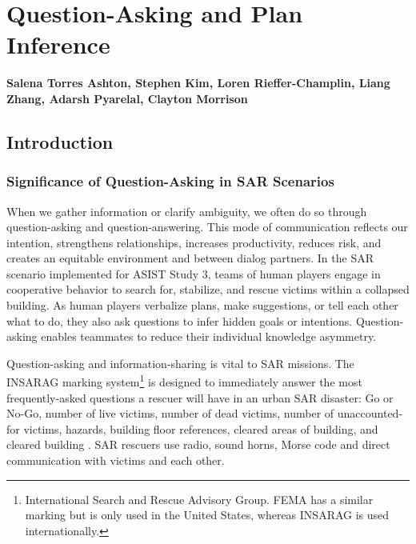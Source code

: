 \chapter{Question-Asking and Plan Inference}
\label{ch:question_plan}
\textbf{Salena Torres Ashton, Stephen Kim, Loren Rieffer-Champlin, Liang Zhang,
Adarsh Pyarelal, Clayton Morrison}

\section{Introduction}
\label{sec:question_plan_intro}

\subsection{Significance of Question-Asking in SAR Scenarios}

When we gather information or clarify ambiguity, we often do so through
question-asking and question-answering. This mode of communication reflects our
intention, strengthens relationships, increases productivity, reduces risk, and
creates an equitable environment \citep{rothe_lake_gureckis_2018, alaimi_2020}
and between dialog partners. In the SAR scenario implemented for ASIST Study 3,
teams of human players engage in cooperative behavior to search for, stabilize,
and rescue victims within a collapsed building. As human players verbalize
plans, make suggestions, or tell each other what to do, they also ask questions
to infer hidden goals or intentions. Question-asking enables teammates to
reduce their individual knowledge asymmetry.


Question-asking and information-sharing is vital to SAR missions.  The INSARAG
marking system\footnote{International Search and Rescue Advisory Group. FEMA
    has a similar marking but is only used in the United States, whereas
    INSARAG is used internationally.} is designed to immediately answer the
    most frequently-asked questions a rescuer will have in an urban SAR
    disaster: Go or No-Go, number of live victims, number of dead victims,
    number of unaccounted-for victims, hazards, building floor references,
    cleared areas of building, and cleared building \citep{insarag_2022}. SAR
    rescuers use radio, sound horns, Morse code and direct communication with
    victims and each other.

